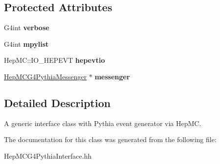 \subsection*{Protected Attributes}
\begin{DoxyCompactItemize}
\item 
\hypertarget{class_hep_m_c_g4_pythia_interface_a53097ae82a7f0288e75c063679579d64}{}G4int {\bfseries verbose}\label{class_hep_m_c_g4_pythia_interface_a53097ae82a7f0288e75c063679579d64}

\item 
\hypertarget{class_hep_m_c_g4_pythia_interface_a327b9fdcde2ff2601ceccf1650a4fb48}{}G4int {\bfseries mpylist}\label{class_hep_m_c_g4_pythia_interface_a327b9fdcde2ff2601ceccf1650a4fb48}

\item 
\hypertarget{class_hep_m_c_g4_pythia_interface_a5aa2077f91e9bd75e551bca38742046e}{}Hep\+M\+C\+::\+I\+O\+\_\+\+H\+E\+P\+E\+V\+T {\bfseries hepevtio}\label{class_hep_m_c_g4_pythia_interface_a5aa2077f91e9bd75e551bca38742046e}

\item 
\hypertarget{class_hep_m_c_g4_pythia_interface_ac0541688df49e9ba60bd7771000eb483}{}\hyperlink{class_hep_m_c_g4_pythia_messenger}{Hep\+M\+C\+G4\+Pythia\+Messenger} $\ast$ {\bfseries messenger}\label{class_hep_m_c_g4_pythia_interface_ac0541688df49e9ba60bd7771000eb483}

\end{DoxyCompactItemize}


\subsection{Detailed Description}
A generic interface class with Pythia event generator via Hep\+M\+C. 

The documentation for this class was generated from the following file\+:\begin{DoxyCompactItemize}
\item 
Hep\+M\+C\+G4\+Pythia\+Interface.\+hh\end{DoxyCompactItemize}
